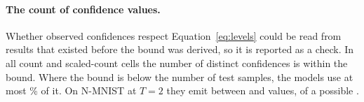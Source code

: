\documentclass[10pt]{article}
\begin{document}
\paragraph{The count of confidence values.} Whether observed confidences respect
Equation~\eqref{eq:levels} could be read from results that existed before the bound was derived,
so it is reported as a check. In all \checkCells{} count and scaled-count %
cells the number of distinct confidences is within the bound. Where the bound is below the %
number of test samples, the models use at most \shareOfBoundMax\% of it. On N-MNIST at $T=2$ %
they emit between \levelsObsMinNmTwo{} and \levelsObsMaxNmTwo{} values, of a possible %
\levelsTenTwo. %
\end{document}
